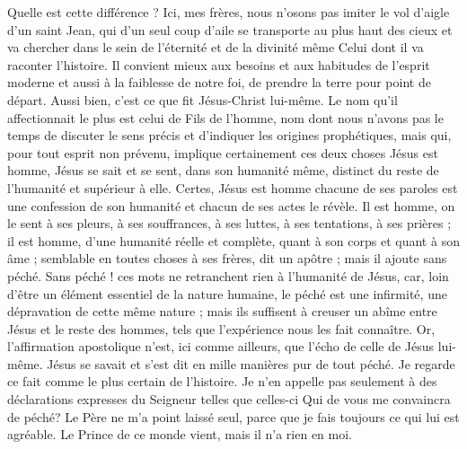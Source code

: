 Quelle est cette différence ? Ici, mes frères, nous n’osons pas imiter le vol d’aigle d’un saint Jean, qui d’un seul coup d’aile se transporte au plus haut des cieux et va chercher dans le sein de l’éternité et de la divinité même Celui dont il va raconter l’histoire.
Il convient mieux aux
besoins et aux habitudes de l’esprit moderne et aussi à la faiblesse de notre foi, de prendre la terre pour point de départ.
Aussi bien, c’est ce que fit Jésus-Christ lui-même.
Le nom qu’il affectionnait le plus est celui de Fils de l’homme, nom dont nous n’avons pas le temps de discuter le sens précis et d’indiquer les origines prophétiques, mais qui, pour tout esprit non prévenu, implique certainement ces deux choses\frcolon{} Jésus est homme, Jésus se sait et se sent, dans son humanité même, distinct du reste de l’humanité et supérieur à elle.
Certes, Jésus est homme\frcolon{} chacune de ses paroles est une confession de son humanité et chacun de ses actes le révèle. Il est homme, on le sent à ses pleurs, à ses souffrances, à ses luttes, à ses tentations, à ses prières ; il est homme, d’une humanité réelle et complète, quant à son corps et quant à son âme ; \Og{} semblable en toutes choses à ses frères\Fg{}, dit un apôtre ; mais il ajoute\frcolon{} \Og{} sans péché\Fg{}.
Sans péché ! ces mots ne retranchent rien à l’humanité de Jésus, car, loin d’être un élément essentiel de la nature humaine, le péché est une infirmité, une dépravation de cette même nature ; mais ils suffisent à creuser un abîme entre Jésus et le reste des hommes, tels que l’expérience nous les fait connaître. Or, l’affirmation apostolique n’est, ici comme ailleurs, que l’écho de celle de Jésus lui-même.
Jésus se savait et s’est dit en mille manières pur de tout péché.
Je regarde ce fait comme le plus certain de l’histoire.
Je n’en appelle pas seulement à des déclarations expresses du Seigneur telles que celles-ci\frcolon{} \Og{} Qui de vous me convaincra de péché? \ocadr{} Le Père ne m’a point laissé seul, parce que je fais toujours ce qui lui est agréable. \ocadr{} Le Prince de ce monde vient, mais il n’a rien en moi.\Fg{}
